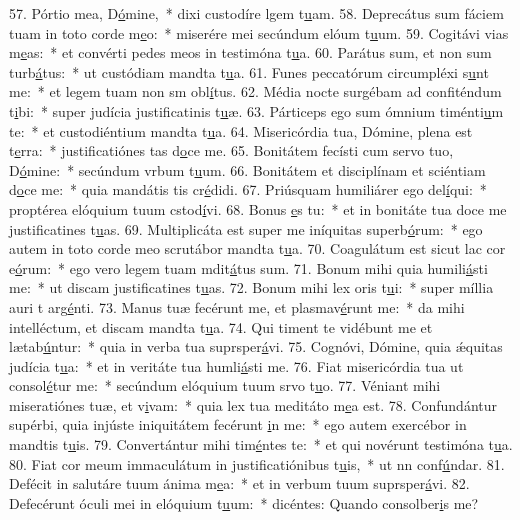 57. Pórtio mea, D\uline{ó}mine,~* dixi custodíre lgem t\uline{u}am.
58. Deprecátus sum fáciem tuam in toto corde m\uline{e}o:~* miserére mei secúndum elóum t\uline{u}um.
59. Cogitávi vias m\uline{e}as:~* et convérti pedes meos in testimóna t\uline{u}a.
60. Parátus sum, et non sum turb\uline{á}tus:~* ut custódiam mandta t\uline{u}a.
61. Funes peccatórum circumpléxi s\uline{u}nt me:~* et legem tuam non sm obl\uline{í}tus.
62. Média nocte surgébam ad confiténdum t\uline{i}bi:~* super judícia justificatinis t\uline{u}æ.
63. Párticeps ego sum ómnium timénti\uline{u}m te:~* et custodiéntium mandta t\uline{u}a.
64. Misericórdia tua, Dómine, plena est t\uline{e}rra:~* justificatiónes tas d\uline{o}ce me.
65. Bonitátem fecísti cum servo tuo, D\uline{ó}mine:~* secúndum vrbum t\uline{u}um.
66. Bonitátem et disciplínam et sciéntiam d\uline{o}ce me:~* quia mandátis tis cr\uline{é}didi.
67. Priúsquam humiliárer ego del\uline{í}qui:~* proptérea elóquium tuum cstod\uline{í}vi.
68. Bonus \uline{e}s tu:~* et in bonitáte tua doce me justificatines t\uline{u}as.
69. Multiplicáta est super me iníquitas superb\uline{ó}rum:~* ego autem in toto corde meo scrutábor mandta t\uline{u}a.
70. Coagulátum est sicut lac cor e\uline{ó}rum:~* ego vero legem tuam mdit\uline{á}tus sum.
71. Bonum mihi quia humili\uline{á}sti me:~* ut discam justificatines t\uline{u}as.
72. Bonum mihi lex oris t\uline{u}i:~* super míllia auri t arg\uline{é}nti.
73. Manus tuæ fecérunt me, et plasmav\uline{é}runt me:~* da mihi intelléctum, et discam mandta t\uline{u}a.
74. Qui timent te vidébunt me et lætab\uline{ú}ntur:~* quia in verba tua suprsper\uline{á}vi.
75. Cognóvi, Dómine, quia ǽquitas judícia t\uline{u}a:~* et in veritáte tua humli\uline{á}sti me.
76. Fiat misericórdia tua ut consol\uline{é}tur me:~* secúndum elóquium tuum srvo t\uline{u}o.
77. Véniant mihi miseratiónes tuæ, et v\uline{i}vam:~* quia lex tua meditáto m\uline{e}a est.
78. Confundántur supérbi, quia injúste iniquitátem fecérunt \uline{i}n me:~* ego autem exercébor in mandtis t\uline{u}is.
79. Convertántur mihi tim\uline{é}ntes te:~* et qui novérunt testimóna t\uline{u}a.
80. Fiat cor meum immaculátum in justificatiónibus t\uline{u}is,~* ut nn conf\uline{ú}ndar.
81. Defécit in salutáre tuum ánima m\uline{e}a:~* et in verbum tuum suprsper\uline{á}vi.
82. Defecérunt óculi mei in elóquium t\uline{u}um:~* dicéntes: Quando consolber\uline{i}s me?
